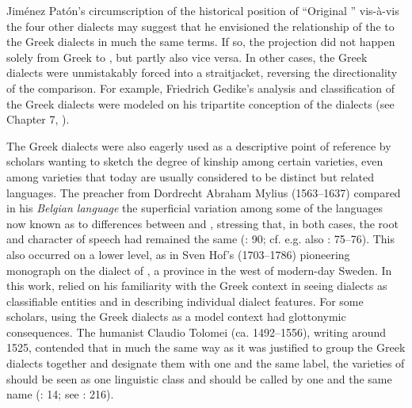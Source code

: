 Jiménez Patón’s circumscription of the historical position of “Original ” vis-à-vis the four other dialects may suggest that he envisioned the relationship of the  to the Greek dialects in much the same terms. If so, the projection did not happen solely from Greek to , but partly also vice versa. In other cases, the Greek dialects were unmistakably forced into a  straitjacket, reversing the directionality of the comparison. For example, Friedrich Gedike’s analysis and classification of the Greek dialects were modeled on his tripartite conception of the  dialects (see Chapter 7, ).

The Greek dialects were also eagerly used as a descriptive point of reference by scholars wanting to sketch the degree of kinship among certain  varieties, even among varieties that today are usually considered to be distinct but related languages. The preacher from Dordrecht Abraham Mylius (1563–1637) compared in his \textit{Belgian language} the superficial variation among some of the languages now known as  to differences between  and , stressing that, in both cases, the root and character of speech had remained the same (\citealt{Mylius1612}: 90; cf. e.g. also \citealt{Boxhorn1647}: 75–76). This also occurred on a lower level, as in Sven Hof’s (1703–1786) pioneering monograph on the dialect of , a province in the west of modern-day Sweden. In this work, \citet[esp. 12–13, 23]{Hof1772} relied on his familiarity with the Greek context in seeing dialects as classifiable entities and in describing individual dialect features. For some scholars, using the Greek dialects as a model context had glottonymic consequences. The  humanist Claudio Tolomei (ca. 1492–1556), writing around 1525, contended that in much the same way as it was justified to group the Greek dialects together and designate them with one and the same label, the varieties of  should be seen as one linguistic class and should be called by one and the same name (\citealt{Tolomei1555}: 14; see \citealt{Trovato1984}: 216).

